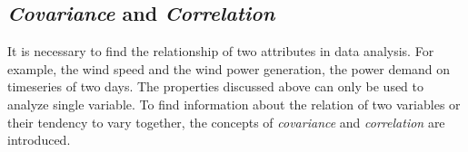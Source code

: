\documentclass[12pt,a4paper]{report}
\begin{document}






        \subsection{\emph{Covariance} and \emph{Correlation}}
        It is necessary to find the relationship of two attributes in data analysis. For example, the wind speed and the wind power generation, the power demand on timeseries of two days. The properties discussed above can only be used to analyze single variable. To find information about the relation of two variables or their tendency to vary together, the concepts of \emph{covariance} and \emph{correlation} are introduced.
\end{document}
